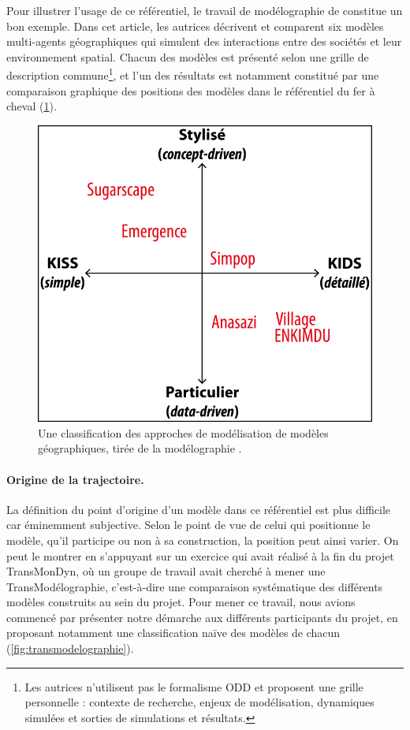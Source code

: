 Pour illustrer l'usage de ce référentiel, le travail de \og modélographie\fg{} de \textcite{schmitt_modelographie_2013} constitue un bon exemple.
Dans cet article, les autrices décrivent et comparent six modèles multi-agents géographiques qui simulent des interactions entre des sociétés et leur environnement spatial.
Chacun des modèles est présenté selon une grille de description commune\footnote{
	Les autrices n'utilisent pas le formalisme ODD \autocite[\S 5-6]{schmitt_modelographie_2013} et proposent une grille personnelle : \og contexte de recherche\fg{}, \og enjeux de modélisation\fg{}, \og dynamiques simulées\fg{} et \og sorties de simulations et résultats\fg{}.
}, et l'un des résultats est notamment constitué par une comparaison graphique des positions des modèles dans le référentiel du \og fer à cheval\fg{} (\cref{fig:modelographie}).


\begin{figure}[H]
	\centering
	\includegraphics[width=.725\linewidth]{img/modelographie_fer-a-cheval.png}
	\caption[Une \og classification des approches de modélisation\fg{} de modèles géographiques.]{Une \og classification des approches de modélisation\fg{} de modèles géographiques, tirée de la \og modélographie\fg{} \textcite[Figure 1]{schmitt_modelographie_2013}.}
	\label{fig:modelographie}
\end{figure}


\paragraph{Origine de la trajectoire.}
La définition du point d'origine d'un modèle dans ce référentiel est plus difficile car éminemment subjective.
Selon le point de vue de celui qui positionne le modèle, qu'il participe ou non à sa construction, la position peut ainsi varier.
On peut le montrer en s'appuyant sur un exercice qui avait réalisé à la fin du projet TransMonDyn, où un groupe de travail avait cherché à mener une \og TransModélographie\fg{}, c'est-à-dire une comparaison systématique des différents modèles construits au sein du projet.
Pour mener ce travail, nous avions commencé par présenter notre démarche aux différents participants du projet, en proposant notamment une classification \og naïve\fg{} des modèles de chacun (\cref{fig:transmodelographie}).

